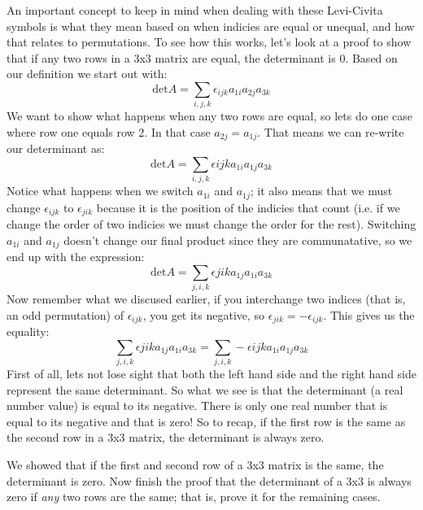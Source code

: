 An important concept to keep in mind when dealing with these Levi-Civita symbols is what they mean based on when indicies are equal or unequal, and how that relates to permutations.  To see how this works, let's look at a proof to show that if any two rows in a 3x3 matrix are equal, the determinant is 0.  Based on our definition we start out with:
\[
\text{det} A = \sum_{i,j,k} \epsilon_{ijk} a_{1i} a_{2j} a_{3k}
\]
We want to show what happens when any two rows are equal, so lets do one case where row one equals row 2.  In that case $a_{2j}=a_{1j}$.  That means we can re-write our determinant as:
\[
\text{det} A =  \sum_{i,j,k} \epsilon{ijk} a_{1i} a_{1j} a_{3k}
\]
Notice what happens when we switch $a_{1i}$ and $a_{1j}$; it also means that we must change $\epsilon_{ijk}$ to $\epsilon_{jik}$ because it is the position of the indicies that count (i.e. if we change the order of two indicies we must change the order for the rest).  Switching $a_{1i}$ and $a_{1j}$ doesn't change our final product since they are communatative, so we end up with the expression:
\[
\text{det} A =   \sum_{j,i,k} \epsilon{jik} a_{1j} a_{1i} a_{3k} 
\]
Now remember what we discused earlier, if you interchange two indices (that is, an odd permutation) of $\epsilon_{ijk}$, you get its negative, so $\epsilon_{jik}=-\epsilon_{ijk}$.  This gives us the equality:
\[
\sum_{j,i,k} \epsilon{jik} a_{1j} a_{1i} a_{3k}=\sum_{j,i,k} - \epsilon{ijk} a_{1i} a_{1j} a_{3k}
\]
First of all, lets not lose sight that both the left hand side and the right hand side represent the same determinant.  So what we see is that the determinant (a real number value) is equal to its negative.  There is only one real number that is equal to its negative and that is zero!  So to recap, if the first row is the same as the second row in a 3x3 matrix, the determinant is always zero.

\begin{exercise}{}
We showed that if the first and second row of a 3x3 matrix is the same, the determinant is zero.  Now finish the proof that the determinant of a 3x3 is always zero if \emph{any} two rows are the same; that is, prove it for the remaining cases.
\end{exercise}{} 


